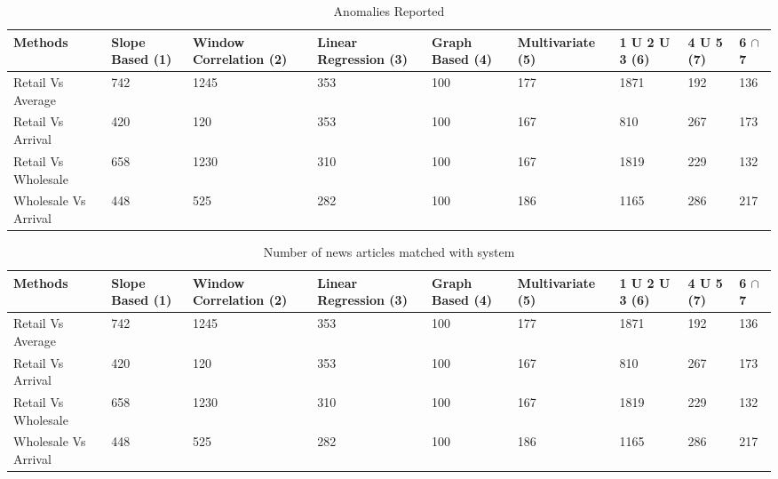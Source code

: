 \documentclass[a4paper,10pt]{report}
\begin{document}
	\begin{table}[]
	\centering
	
	\resizebox{\textwidth}{!}
	{\begin{tabular}{|l|l|l|l|l|l|l|l|l|}
	\hline
	Methods		    & Slope Based (1) & Window Correlation (2) & Linear Regression (3) & Graph Based (4) & Multivariate (5) & 1 U 2 U 3 (6) & 4 U 5 (7) & 6  $\cap$ 7 \\
	\hline
	Retail Vs Average    & 742             & 1245                   & 353                   & 100             & 177              & 1871          & 192       & 136       \\
	\hline
	Retail Vs Arrival    & 420             & 120                    & 353                   & 100             & 167              & 810           & 267       & 173       \\
	\hline
	Retail Vs Wholesale  & 658             & 1230                   & 310                   & 100             & 167              & 1819          & 229       & 132       \\
	\hline
	Wholesale Vs Arrival & 448             & 525                    & 282                   & 100             & 186              & 1165          & 286       & 217       \\
	\hline
	\end{tabular}}
	\caption{Anomalies Reported}
	\label{AnomaliesReported}
	\end{table}
    
    
    

  
	\begin{table}[]
	\centering
	
	\resizebox{\textwidth}{!}
	{\begin{tabular}{|l|l|l|l|l|l|l|l|l|}
	\hline
	Methods		    & Slope Based (1) & Window Correlation (2) & Linear Regression (3) & Graph Based (4) & Multivariate (5) & 1 U 2 U 3 (6) & 4 U 5 (7) & 6  $\cap$ 7 \\
	\hline
	Retail Vs Average    & 742             & 1245                   & 353                   & 100             & 177              & 1871          & 192       & 136       \\
	\hline
	Retail Vs Arrival    & 420             & 120                    & 353                   & 100             & 167              & 810           & 267       & 173       \\
	\hline
	Retail Vs Wholesale  & 658             & 1230                   & 310                   & 100             & 167              & 1819          & 229       & 132       \\
	\hline
	Wholesale Vs Arrival & 448             & 525                    & 282                   & 100             & 186              & 1165          & 286       & 217       \\
	\hline
	\end{tabular}}
	\caption{Number of news articles matched with system}
	\label{ArticlesMatched}
	\end{table}
	
\end{document}
